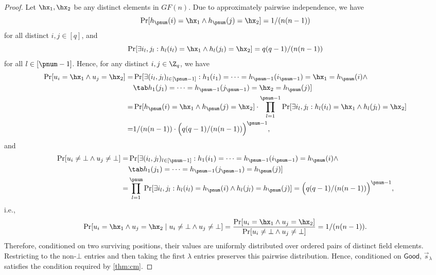 \begin{proof}
Let $\hx_1,\hx_2$ be any distinct elements in $GF(n)$.
Due to approximately pairwise independence, we have 
$$
\Pr[ h_\pnum(i)=\hx_1\land  h_\pnum(j)=\hx_2]=1/(n(n-1))
$$
for all distinct $i,j\in[q]$,
and
$$
\Pr[\exists i_l,j_l: h_l(i_l)=\hx_1\land h_l(j_l)=\hx_2]=q(q-1)/(n(n-1))
$$
for all $l\in[\pnum-1]$.
Hence, for any distinct $i,j\in\Z_q$, we have
\[\begin{split}
\Pr[ u_i=\hx_1\land  u_j=\hx_2]
=&\Pr[\exists (i_l,j_l)_{l\in[\pnum-1]}: 
 h_1(i_1)=\cdots= h_{\pnum-1}(i_{\pnum-1})=\hx_1= h_\pnum(i)\land\\
 &\tab h_1(j_1)=\cdots= h_{\pnum-1}(j_{\pnum-1})=\hx_2= h_\pnum(j)]\\
=&\Pr[ h_\pnum(i)=\hx_1\land  h_\pnum(j)=\hx_2]\cdot\prod_{l=1}^{\pnum-1}\Pr[\exists i_l,j_l: h_l(i_l)=\hx_1\land  h_l(j_l)=\hx_2]\\
=&1/(n(n-1))\cdot \Big(q(q-1)/(n(n-1))\Big)^{\pnum-1},
\end{split}\]
and
\[\begin{split}
\Pr[ u_i\neq\bot\land  u_j\neq \bot]
=&\Pr[\exists (i_l,j_l)_{l\in[\pnum-1]}: h_1(i_1)=\cdots= h_{\pnum-1}(i_{\pnum-1})= h_\pnum(i)\land\\
&\tab  h_1(j_1)=\cdots= h_{\pnum-1}(j_{\pnum-1})= h_\pnum(j)]
\\
=&\prod_{l=1}^\pnum\Pr[\exists i_l,j_l: h_l(i_l)=h_\pnum(i)\land  h_l(j_l)= h_\pnum(j)]
=\Big(q(q-1)/(n(n-1))\Big)^{\pnum-1},
\end{split}\]
i.e.,
$$
 \Pr[ u_i=\hx_1\land  u_j=\hx_2\mid u_i\neq \bot\land  u_j\neq\bot]=\frac{\Pr[ u_i=\hx_1\land  u_j=\hx_2]}{\Pr[ u_i\neq\bot\land  u_j\neq \bot]}=1/(n(n-1)).
$$
Therefore, conditioned on two surviving positions, their values are uniformly distributed over ordered pairs of distinct field elements. Restricting to the non-$\bot$ entries and then taking the first $\lambda$ entries preserves this pairwise distribution. Hence, conditioned on $\mathsf{Good}$, $\vec{s}_{\lambda}$ satisfies the condition required by \cref{thm:cm}.
\end{proof}


